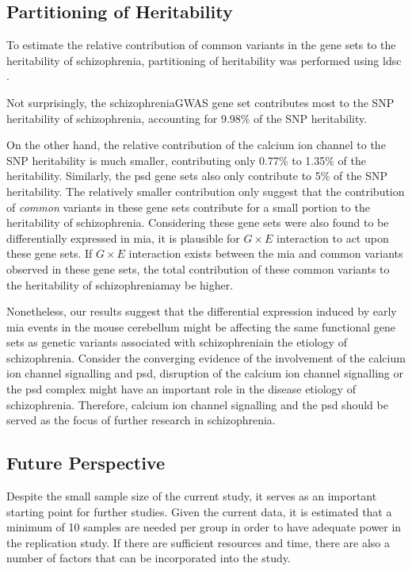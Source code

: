 \documentclass[12pt]{scrbook}
\newcommand*{\scz}{schizophrenia}
\begin{document}
\subsection{Partitioning of Heritability}
To estimate the relative contribution of common variants in the gene sets to the heritability of \scz, partitioning of heritability was performed using \gls{ldsc} \citet{Bulik-Sullivan2015}.

Not surprisingly, the \scz \gls{GWAS} gene set contributes most to the \gls{SNP} heritability of \scz, accounting for 9.98\% of the \gls{SNP} heritability.

On the other hand, the relative contribution of the calcium ion channel to the \gls{SNP} heritability is much smaller, contributing only 0.77\% to 1.35\% of the heritability.
Similarly, the \gls{psd} gene sets also only contribute to 5\% of the \gls{SNP} heritability.
The relatively smaller contribution only suggest that the contribution of \emph{common} variants in these gene sets contribute for a small portion to the heritability of \scz.
Considering these gene sets were also found to be differentially expressed in \gls{mia}, it is plausible for $G\times E$ interaction to act upon these gene sets.
If $G\times E$ interaction exists between the \gls{mia} and common variants observed in these gene sets, the total contribution of these common variants to the heritability of \scz may be higher.

Nonetheless, our results suggest that the differential expression induced by early \gls{mia} events in the mouse cerebellum might be affecting the same functional gene sets as genetic variants associated with \scz in the etiology of \scz.
Consider the converging evidence of the involvement of the calcium ion channel signalling and \gls{psd}, disruption of the calcium ion channel signalling or the \gls{psd} complex might have an important role in the disease etiology of \scz.
Therefore, calcium ion channel signalling and the \gls{psd} should be served as the focus of further research in \scz.

\subsection{Future Perspective}
Despite the small sample size of the current study, it serves as an important starting point for further studies. 
Given the current data, it is estimated that a minimum of 10 samples are needed per group in order to have adequate power in the replication study. 
If there are sufficient resources and time, there are also a number of factors that can be incorporated into the study.
\end{document}
